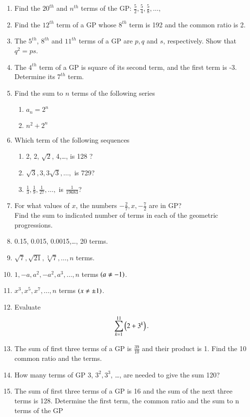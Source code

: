\begin{enumerate}[label=\thesubsection.\arabic*.,ref=\thesubsection.\theenumi]
\item Find the $20^{th}$ and $n^{th}$ terms of the GP: $\frac{5}{2}, \frac{5}{4}, \frac{5}{8},\dots, $
\item Find the $12^{th}$ term of a GP  whose $8^{th}$ term is 192 and the common ratio is 2.
\item The $5^{th}$, $8^{th}$ and $11^{th}$ terms of a GP  are $p, q$ and $s$, respectively. Show that 
$q^2 = ps$.
\item The $4^{th}$ term of a GP  is square of its second term, and the first term is -3. Determine its $7^{th}$ term.
\item Find the sum to $n$ terms of the following series
\begin{enumerate}
\item $a_n = 2^n$
\item $n^2 + 2^n$
\end{enumerate}
\item Which term of the following sequences
\begin{enumerate}
	\item 2, 2, $\sqrt{2}$, 4,\dots,  is 128 ?
	\item $\sqrt{3}, 3, 3\sqrt{3},\dots,$  is 729?
	\item $\frac{1}{3}, \frac{1}{9}, \frac{1}{27}, \dots,$  is $\frac{1}{19683}$?
\end{enumerate}
\item For what values of $x$, the numbers $-\frac{2}{7}, x, -\frac{7}{2}$ are in GP?
\\
	Find the sum to indicated number of terms in each of the geometric progressions.
\item 0.15, 0.015, 0.0015,\dots,  20 terms.
\item $\sqrt{7}, \sqrt{21}, \sqrt[3]{7}, \dots,  n$ terms.
\item $1, -a, a^2, -a^2, a^3,\dots,  n$ terms $\left(a \neq -1\right)$.
\item $x^3, x^5, x^7,\dots,  n$ terms $\left(x \neq \pm 1\right)$.
\item Evaluate $$\sum _{k=1}^{11} \left(2 + 3^k\right).$$
\item The sum of first three terms of a GP  is $\frac{39}{10}$ and their product is 1. Find the 10
common ratio and the terms.
\item How many terms of GP  3, $3^2, 3^3$, \dots,  are needed to give the sum 120?
\item The sum of first three terms of a GP  is 16 and the sum of the next three terms is 128. Determine the first term, the common ratio and the sum to n terms of the GP 

\end{enumerate}
